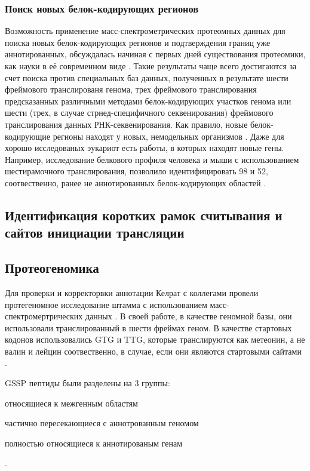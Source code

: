 \subsubsection{Поиск новых белок-кодирующих регионов}
Возможность применение масс-спектрометрических протеомных данных для поиска новых белок-кодирующих регионов и подтверждения границ уже аннотированных, обсуждалась начиная с первых дней существования протеомики, как науки в её современном виде \cite{choudhary2001interrogating, andersen2001mass}. Такие результаты чаще всего достигаются за счет поиска против специальных баз данных, полученных в результате шести фреймового транслированя генома, трех фреймового транслирования предсказанных различными методами белок-кодирующих участков генома или шести (трех, в случае стрнед-специфичного секвенирования) фреймового транслирования данных РНК-секвенирования. Как правило, новые белок-кодирующие регионы находят у новых, немодельных организмов \cite{castellana2014automated, castellana2008discovery, yang2011discovery}. Даже для хорошо исследованых эукариот есть работы, в которых находят новые гены. Например, исследование белкового профиля человека и мыши с использованием шестирамочного транслирования, позволило идентифицировать 98 и 52, соотвественно, ранее не аннотированных белок-кодирующих областей \cite{branca2014hirief}.

\subsection{Идентификация коротких рамок считывания и сайтов инициации трансляции}



\subsection{Протеогеномика }
Для проверки и корректорвки аннотации Келрат с коллегами провели протегеномное исследование штамма  с использованием масс-спектромертрических данных \cite{kelkar2011proteogenomic}. В своей работе, в качестве геномной базы, они использовали транслированный в шести фреймах геном. В качестве стартовых кодонов использовались GTG и TTG, которые транслируются как метеонин, а не валин и лейцин соотвественно, в случае, если они являются стартовыми сайтами \cite{cole1998erratum}. 

GSSP пептиды были разделены на 3 группы:
\begin{inparaenum}
    \item относящиеся к межгенным областям
    \item частично пересекающиеся с аннотрованным геномом
    \item полностью относящиеся к аннотированым генам
\end{inparaenum}.

